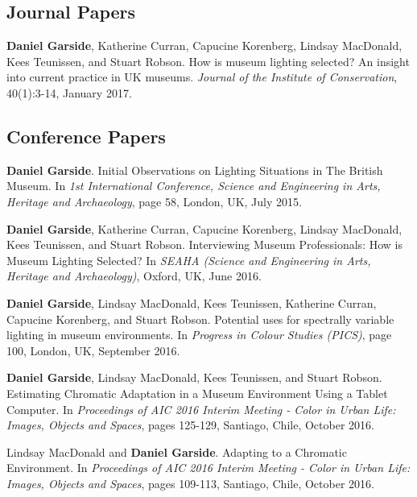{\parindent0pt \footnotesize


\subsection*{Journal Papers}

\textbf{Daniel Garside}, Katherine Curran, Capucine Korenberg, Lindsay MacDonald, Kees Teunissen, and Stuart Robson. How is museum lighting selected? An insight into current practice in UK museums. \textit{Journal of the Institute of Conservation}, 40(1):3-14, January 2017. 

\subsection*{Conference Papers}

\textbf{Daniel Garside}. Initial Observations on Lighting Situations in The British Museum. In \textit{1st International Conference, Science and Engineering in Arts, Heritage and Archaeology}, page 58, London, UK, July 2015. 
\bigskip

\textbf{Daniel Garside}, Katherine Curran, Capucine Korenberg, Lindsay MacDonald, Kees Teunissen, and Stuart Robson. Interviewing Museum Professionals: How is Museum Lighting Selected? In \textit{SEAHA (Science and Engineering in Arts, Heritage and Archaeology)}, Oxford, UK, June 2016. 
\bigskip

\textbf{Daniel Garside}, Lindsay MacDonald, Kees Teunissen, Katherine Curran, Capucine Korenberg, and Stuart Robson. Potential uses for spectrally variable lighting in museum environments. In \textit{Progress in Colour Studies (PICS)}, page 100, London, UK, September 2016. 
\smallskip %

\textbf{Daniel Garside}, Lindsay MacDonald, Kees Teunissen, and Stuart Robson. Estimating Chromatic Adaptation in a Museum Environment Using a Tablet Computer. In
\textit{Proceedings of AIC 2016 Interim Meeting - Color in Urban Life: Images, Objects and Spaces}, pages 125-129, Santiago, Chile, October 2016. 
\bigskip

Lindsay MacDonald and \textbf{Daniel Garside}. Adapting to a Chromatic Environment. In \textit{Proceedings of AIC 2016 Interim Meeting - Color in Urban Life: Images, Objects and Spaces}, pages 109-113, Santiago, Chile, October 2016.
\bigskip

}
